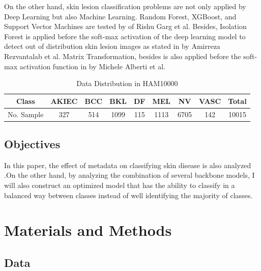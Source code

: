 \documentclass[sensors,article,submit,pdftex,moreauthors]{Definitions/mdpi}
\begin{document}
On the other hand, skin lesion classification problems are not only applied by Deep Learning but also Machine Learning. Random Forest, XGBoost, and Support Vector Machines are tested by \cite{03798} of Rishu Garg et al. Besides, Isolation Forest is applied before the soft-max activation of the deep learning model to detect out of distribution skin lesion images as stated in\cite{10348} by Amirreza Rezvantalab et al. Matrix Transformation, besides is also applied before the soft-max activation function in \cite{05045} by Michele Alberti et al. 
\begin{table}[ht]
	\centering
	\begin{tabular}{|c c c c c c c c c|} 
		\hline
		Class & AKIEC & BCC & BKL & DF & MEL & NV & VASC & Total \\ 
		\hline
		No. Sample & 327 & 514 & 1099 & 115 & 1113 & 6705 & 142 & 10015 \\
		\hline
	\end{tabular}
	\caption{Data Distribution in HAM10000}
	\label{table:1}
\end{table}

\subsection{Objectives}
In this paper, the effect of metadata on classifying skin disease is also analyzed .On the other hand, by analyzing the combination of several backbone models, I will also construct an optimized model that has the ability to classify in a balanced way between classes instead of well identifying the majority of classes.
\section{Materials and Methods}
\subsection{Data}
\end{document}
